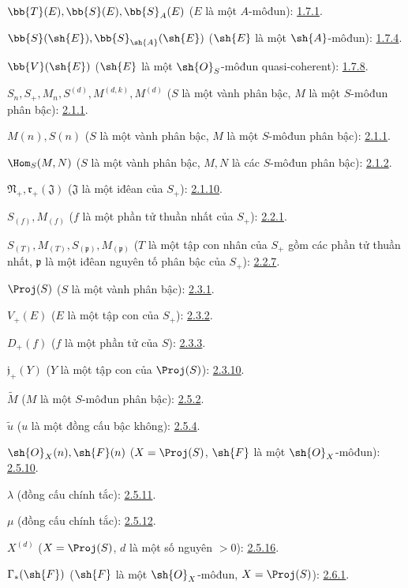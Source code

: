 \documentclass[oneside,10pt]{amsart}
\begin{document}
$\bb{T}(E),\bb{S}(E),\bb{S}_A(E)$ ($E$ là một $A$-môđun): \hyperref[II.1.7.1]{1.7.1}.

$\bb{S}(\sh{E}),\bb{S}_{\sh{A}}(\sh{E})$
($\sh{E}$ là một $\sh{A}$-môđun): \hyperref[II.1.7.4]{1.7.4}.

$\bb{V}(\sh{E})$ ($\sh{E}$ là một $\sh{O}_S$-môđun quasi-coherent): \hyperref[II.1.7.8]{1.7.8}.

$S_n,S_+,M_n,S^{(d)},M^{(d,k)},M^{(d)}$
($S$ là một vành phân bậc, $M$ là một $S$-môđun phân bậc): \hyperref[II.2.1.1]{2.1.1}.

$M(n),S(n)$ ($S$ là một vành phân bậc, $M$ là một $S$-môđun phân bậc): \hyperref[II.2.1.1]{2.1.1}.

$\Hom_S(M,N)$ ($S$ là một vành phân bậc, $M,N$ là các $S$-môđun phân bậc): \hyperref[II.2.1.2]{2.1.2}.

$\mathfrak N_+,\mathfrak r_+(\mathfrak J)$
($\mathfrak J$ là một iđêan của $S_+$): \hyperref[II.2.1.10]{2.1.10}.

$S_{(f)},M_{(f)}$ ($f$ là một phần tử thuần nhất của $S_+$): \hyperref[II.2.2.1]{2.2.1}.

$S_{(T)},M_{(T)},S_{(\mathfrak p)},M_{(\mathfrak p)}$
($T$ là một tập con nhân của $S_+$ gồm các phần tử thuần nhất,
$\mathfrak p$ là một iđêan nguyên tố phân bậc của $S_+$): \hyperref[II.2.2.7]{2.2.7}.

$\Proj(S)$ ($S$ là một vành phân bậc): \hyperref[II.2.3.1]{2.3.1}.

$V_+(E)$ ($E$ là một tập con của $S_+$): \hyperref[II.2.3.2]{2.3.2}.

$D_+(f)$ ($f$ là một phần tử của $S$): \hyperref[II.2.3.3]{2.3.3}.

$\mathfrak j_+(Y)$ ($Y$ là một tập con của $\Proj(S)$): \hyperref[II.2.3.10]{2.3.10}.

$\widetilde M$ ($M$ là một $S$-môđun phân bậc): \hyperref[II.2.5.2]{2.5.2}.

$\widetilde u$ ($u$ là một đồng cấu bậc không): \hyperref[II.2.5.4]{2.5.4}.

$\sh{O}_X(n),\sh{F}(n)$
($X=\Proj(S)$, $\sh{F}$ là một $\sh{O}_X$-môđun): \hyperref[II.2.5.10]{2.5.10}.

$\lambda$ (đồng cấu chính tắc): \hyperref[II.2.5.11]{2.5.11}.

$\mu$ (đồng cấu chính tắc): \hyperref[II.2.5.12]{2.5.12}.

$X^{(d)}$ ($X=\Proj(S)$, $d$ là một số nguyên $>0$): \hyperref[II.2.5.16]{2.5.16}.

$\Gamma_*(\sh{F})$ ($\sh{F}$ là một $\sh{O}_X$-môđun,
$X=\Proj(S)$): \hyperref[II.2.6.1]{2.6.1}.
\end{document}
